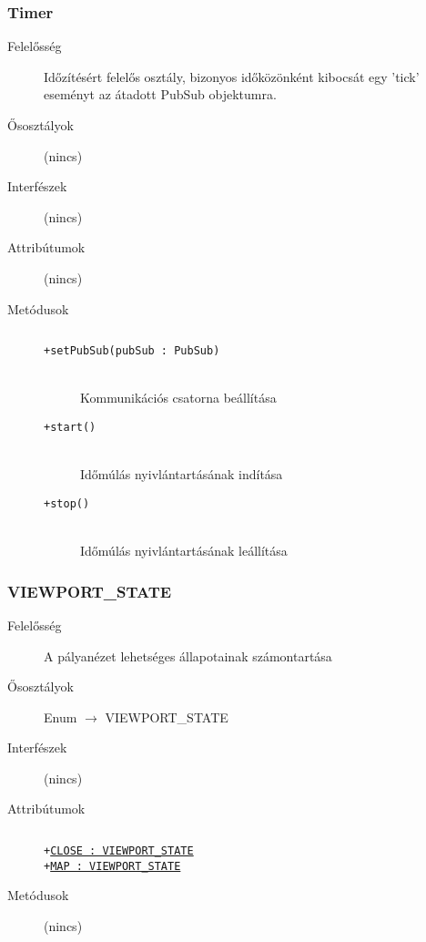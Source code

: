 		\subsubsection{Timer}
			\begin{description}

				\item[Felelősség] Időzítésért felelős osztály, bizonyos időközönként kibocsát egy 'tick' eseményt az átadott PubSub objektumra.

				\item[Ősosztályok] (nincs)
				\item[Interfészek] (nincs)
				\item[Attribútumok] (nincs)
				\item[Metódusok]$\ $
					\begin{description}
						\item[\texttt{+setPubSub(pubSub : PubSub)}] \hfill \\Kommunikációs csatorna beállítása 
						\item[\texttt{+start()}] \hfill \\Időmúlás nyivlántartásának indítása 
						\item[\texttt{+stop()}] \hfill \\Időmúlás nyivlántartásának leállítása 
					\end{description}
			\end{description}

		\subsubsection{VIEWPORT\_STATE}
			\begin{description}

				\item[Felelősség] A pályanézet lehetséges állapotainak számontartása

				\item[Ősosztályok] Enum $\rightarrow{}$ VIEWPORT\_STATE
				\item[Interfészek] (nincs)
				\item[Attribútumok]$\ $
					\begin{description}
						\item[\texttt{+\underline{CLOSE : VIEWPORT\_STATE}}]%
						\item[\texttt{+\underline{MAP : VIEWPORT\_STATE}}]%
					\end{description}
				\item[Metódusok] (nincs)
			\end{description}


